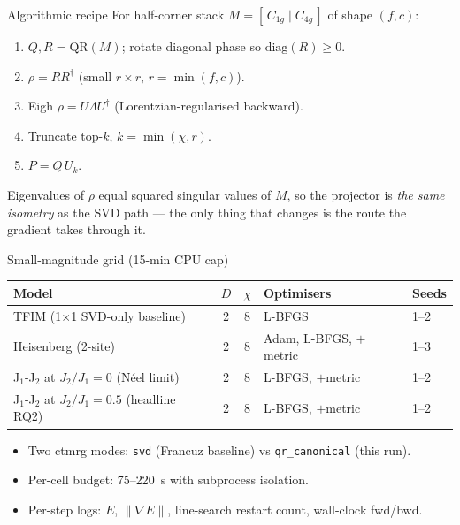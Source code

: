 \documentclass[11pt,aspectratio=169]{beamer}
\begin{document}
\begin{frame}{Algorithmic recipe}
  For half-corner stack $M = [\,C_{1g} \mid C_{4g}\,]$ of shape $(f, c)$:
  \begin{enumerate}
    \item $Q,R = \mathrm{QR}(M)$; rotate diagonal phase so $\mathrm{diag}(R)\!\ge\!0$.
    \item $\rho = R R^\dagger$ (small $r\times r$, $r=\min(f,c)$).
    \item Eigh $\rho = U\Lambda U^\dagger$ (Lorentzian-regularised backward).
    \item Truncate top-$k$, $k=\min(\chi, r)$.
    \item $P = Q\,U_{k}$.
  \end{enumerate}
  \pause
  Eigenvalues of $\rho$ equal squared singular values of $M$, so the projector is
  \emph{the same isometry} as the SVD path --- the only thing that changes is
  the route the gradient takes through it.
\end{frame}

\begin{frame}{Small-magnitude grid (15-min CPU cap)}
  \begin{tabular}{l c c l l}
    \toprule
    Model & $D$ & $\chi$ & Optimisers & Seeds \\
    \midrule
    TFIM (1$\times$1 \alert{SVD-only baseline}) & 2 & 8 & L-BFGS & 1--2 \\
    Heisenberg (2-site) & 2 & 8 & Adam, L-BFGS, $+$metric & 1--3 \\
    J$_1$-J$_2$ at $J_2/J_1=0$ (Néel limit) & 2 & 8 & L-BFGS, $+$metric & 1--2 \\
    J$_1$-J$_2$ at $J_2/J_1=0.5$ \alert{(headline RQ2)} & 2 & 8 & L-BFGS, $+$metric & 1--2 \\
    \bottomrule
  \end{tabular}
  \vspace{8pt}
  \pause
  \begin{itemize}
    \item Two ctmrg modes: \texttt{svd} (Francuz baseline) vs \texttt{qr\_canonical} (this run).
    \item Per-cell budget: 75--220~s with subprocess isolation.
    \item Per-step logs: $E$, $\|\nabla E\|$, line-search restart count, wall-clock fwd/bwd.
  \end{itemize}
\end{frame}
\end{document}
